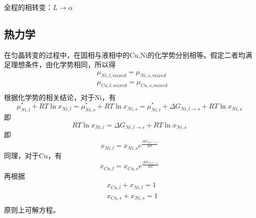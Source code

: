 全程的相转变：$L\to\alpha$

\subsection{热力学}
在匀晶转变的过程中，在固相与液相中的Cu,Ni的化学势分别相等。假定二者均满足理想条件，由化学势相同，所以得
\begin{align}
&\mu_{Ni,l,mixed}=\mu_{Ni,s,mixed}\\
&\mu_{Cu,l,mixed}=\mu_{Cu,s,mixed}\\
\end{align}
根据化学势的相关结论，对于Ni，有
$$
\mu_{Ni,l}^*+RT \ln x_{Ni,l}=\mu_{Ni,s}^*+RT \ln x_{Ni,s}=\mu_{Ni,l}^*+\Delta G_{Ni, l\rightarrow s} + RT \ln x_{Ni,s}
$$
即
$$
RT \ln x_{Ni,l}=\Delta G_{Ni, l\rightarrow s} + RT \ln x_{Ni,s}
$$
即
\begin{equation}
x_{Ni,l}=x_{Ni,s}e^{\frac{\Delta G_{Ni, l\rightarrow s}}{RT}}
\end{equation}
同理，对于Cu，有
\begin{equation}
x_{Cu,l}=x_{Cu,s}e^{\frac{\Delta G_{Cu, l\rightarrow s}}{RT}}
\end{equation}
再根据
\begin{align}
&x_{Cu,l}+x_{Ni,l}=1\\
&x_{Cu,s}+x_{Ni,s}=1\\
\end{align}
原则上可解方程。
